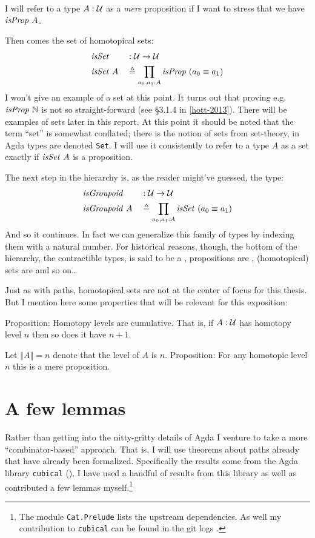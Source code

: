 I will refer to a type $A \mathrel{:} \mathcal{U}$ as a \emph{mere} proposition if I want to
stress that we have $\isProp\ A$.

Then comes the set of homotopical sets:
%
\begin{equation}
\begin{aligned}
& \isSet    && \tp \MCU \to \MCU \\
& \isSet\ A && \defeq \prod_{a_0, a_1 \tp A} \isProp\ (a_0 \equiv a_1)
\end{aligned}
\end{equation}
%
I won't give an example of a set at this point. It turns out that proving e.g.
$\isProp\ \bN$ is not so straight-forward (see \S3.1.4 in \ref{hott-2013}).
There will be examples of sets later in this report. At this point it should be
noted that the term ``set'' is somewhat conflated; there is the notion of sets
from set-theory, in Agda types are denoted \texttt{Set}. I will use it
consistently to refer to a type $A$ as a set exactly if $\isSet\ A$ is
a proposition.

The next step in the hierarchy is, as the reader might've guessed, the type:
%
\begin{equation}
\begin{aligned}
& \isGroupoid    && \tp \MCU \to \MCU \\
& \isGroupoid\ A && \defeq \prod_{a_0, a_1 \tp A} \isSet\ (a_0 \equiv a_1)
\end{aligned}
\end{equation}
%
And so it continues. In fact we can generalize this family of types by indexing
them with a natural number. For historical reasons, though, the bottom of the
hierarchy, the contractible types, is said to be a , propositions
are , (homotopical) sets are  and so on\ldots

Just as with paths, homotopical sets are not at the center of focus for this
thesis. But I mention here some properties that will be relevant for this
exposition:

Proposition: Homotopy levels are cumulative. That is, if $A \mathrel{:} \mathcal{U}$ has
homotopy level $n$ then so does it have $n + 1$.

Let $\left\Vert A \right\Vert = n$ denote that the level of $A$ is $n$.
Proposition: For any homotopic level $n$ this is a mere proposition.
%
\section{A few lemmas}
Rather than getting into the nitty-gritty details of Agda I venture to take a
more ``combinator-based'' approach. That is, I will use theorems about paths
already that have already been formalized. Specifically the results come from
the Agda library \texttt{cubical} (). I have used a handful of
results from this library as well as contributed a few lemmas myself.\footnote{The module \texttt{Cat.Prelude} lists the upstream dependencies. As well my contribution to \texttt{cubical} can be found in the git logs .}

